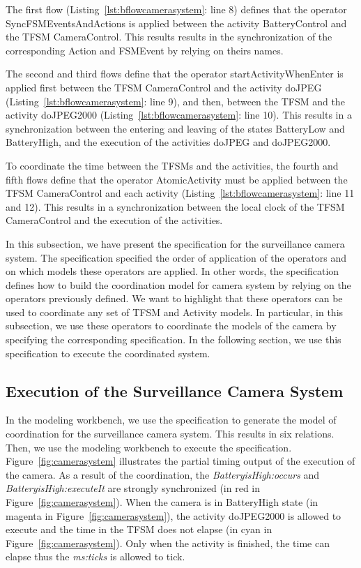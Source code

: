 The first flow (Listing~\ref{lst:bflowcamerasystem}: line 8) defines that the operator SyncFSMEventsAndActions is applied between the activity BatteryControl and the TFSM CameraControl. This results results in the synchronization of the corresponding Action and FSMEvent by relying on theirs names. 

The second and third flows define that the operator startActivityWhenEnter is applied first between the TFSM CameraControl and the activity doJPEG (Listing~\ref{lst:bflowcamerasystem}: line 9), and then, between the TFSM and the activity doJPEG2000 (Listing~\ref{lst:bflowcamerasystem}: line 10). This results in a synchronization between the entering and leaving of the states BatteryLow and BatteryHigh, and the execution of the activities doJPEG and doJPEG2000. 

To coordinate the time between the TFSMs and the activities, the fourth and fifth flows define that the operator AtomicActivity must be applied between the TFSM CameraControl and each activity (Listing~\ref{lst:bflowcamerasystem}: line 11 and 12). This results in a synchronization between the local clock of the TFSM CameraControl and the execution of the activities. 

In this subsection, we have present the \bflow specification for the surveillance camera system. The specification specified the order of application of the operators and on which models these operators are applied. In other words, the \bflow specification defines how to build the coordination model for camera system by relying on the operators previously defined. We want to highlight that these \bcool operators can be used to coordinate any set of TFSM and Activity models. In particular, in this subsection, we use these operators to coordinate the models of the camera by specifying the corresponding \bflow specification. In the following section, we use this specification to execute the coordinated system.    

\subsection{Execution of the Surveillance Camera System}

In the modeling workbench, we use the \bflow specification to generate the model of coordination for the surveillance camera system. This results in six \ccsl relations. Then, we use the modeling workbench to execute the \ccsl specification. Figure~\ref{fig:camerasystem} illustrates the partial timing output of the execution of the camera. As a result of the coordination, the \mse \emph{BatteryisHigh:occurs} and \emph{BatteryisHigh:executeIt} are strongly synchronized (in red in Figure~\ref{fig:camerasystem}). When the camera is in BatteryHigh state (in magenta in Figure~\ref{fig:camerasystem}), the activity doJPEG2000 is allowed to execute and the time in the TFSM does not elapse (in cyan in Figure~\ref{fig:camerasystem}). Only when the activity is finished, the time can elapse thus the \mse \emph{ms:ticks} is allowed to tick. 

